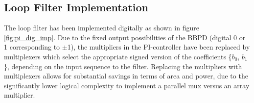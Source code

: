 






		\subsection{Loop Filter Implementation}

			The loop filter has been implemented digitally as shown in figure \ref{fig:pi_dig_imp}. Due to the fixed output possibilities of the BBPD (digital 0 or 1 corresponding to $\pm$1), the multipliers in the PI-controller have been replaced by multiplexers which select the appropriate signed version of the coefficients \{$b_0$, $b_1$\}, depending on the input sequence to the filter. Replacing the multipliers with multiplexers allows for substantial savings in terms of area and power, due to the significantly lower logical complexity to implement a parallel mux versus an array multiplier. 

